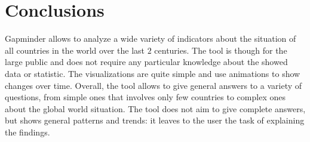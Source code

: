 \section{Conclusions}
\label{sec:conclusions}

Gapminder allows to analyze a wide variety of indicators about the situation of all countries in the world over the last $2$ centuries.
The tool is though for the large public and does not require any particular knowledge about the showed data or statistic.
The visualizations are quite simple and use animations to show changes over time.
Overall, the tool allows to give general answers to a variety of questions, from simple ones that involves only few countries to complex ones about the global world situation.
The tool does not aim to give complete answers, but shows general patterns and trends:
it leaves to the user the task of explaining the findings.
